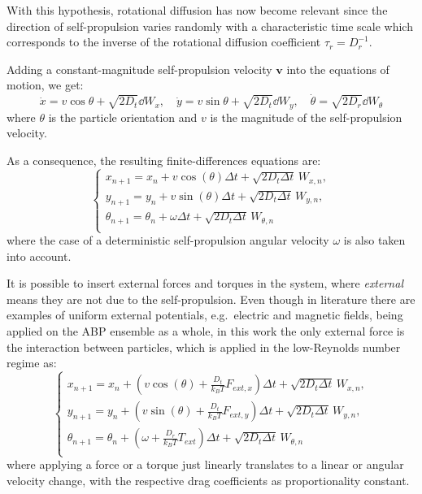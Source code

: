 \documentclass[../../master_thesis_np.tex]{subfiles}
\begin{document}
		With this hypothesis, rotational diffusion has now become relevant since the direction of self-propulsion varies randomly with a characteristic time scale which corresponds to the inverse of the rotational diffusion coefficient $\tau_r = D_r^{-1}$. 
		
		Adding a constant-magnitude self-propulsion velocity $\mathbf{v}$ into the equations of motion, we get:
		\begin{equation}
			\dot{x} = v \cos{\theta} + \sqrt{2D_t}\dd{W_x} , \quad \dot{y} = v \sin{\theta} + \sqrt{2D_t}\dd{W_y}, \quad \dot{\theta} = \sqrt{2D_r}\dd{W_{\theta}}
		\end{equation}
		where $\theta$ is the particle orientation and $v$ is the magnitude of the self-propulsion velocity.
		
		As a consequence, the resulting finite-differences equations are:
		\begin{equation} \label{eq:fin_diff1}
			\begin{cases}
				x_{n+1} = x_n + v \cos(\theta) \Delta t + \sqrt{2D_t \Delta t} \, W_{x,n},\\
				y_{n+1} = y_n + v \sin(\theta) \Delta t + \sqrt{2D_t \Delta t} \, W_{y,n},\\
				\theta_{n+1} = \theta_n + \omega \Delta t + \sqrt{2D_t \Delta t} \, W_{\theta,n}\\
			\end{cases}
		\end{equation}
		where the case of a deterministic self-propulsion angular velocity $\omega$ is also taken into account.
		
		It is possible to insert external forces and torques in the system, where \emph{external} means they are not due to the self-propulsion. Even though in literature there are examples of uniform external potentials, e.g.\ electric and magnetic fields, being applied on the ABP ensemble as a whole, in this work the only external force is the interaction between particles, which is applied in the low-Reynolds number regime as:
		\begin{equation} \label{eq:fin_diff_with_forces}
			\begin{cases}
				x_{n+1} = x_n + \left( v \cos(\theta) + \frac{D_t}{k_B T} F_{ext,x} \right) \Delta t + \sqrt{2D_t \Delta t} \, W_{x,n},\\
				y_{n+1} = y_n + \left( v \sin(\theta) + \frac{D_t}{k_B T} F_{ext,y} \right) \Delta t + \sqrt{2D_t \Delta t} \, W_{y,n},\\
				\theta_{n+1} = \theta_n +\left(\omega + \frac{D_r}{k_B T}{}T_{ext}\right) \Delta t + \sqrt{2D_t \Delta t} \, W_{\theta,n}\\
			\end{cases}
		\end{equation}
		where applying a force or a torque just linearly translates to a linear or angular velocity change, with the respective drag coefficients as proportionality constant.
		
\end{document}

